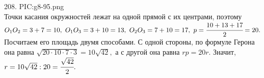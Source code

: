 208. {{PIC:g8-95.png}}\\
Точки касания окружностей лежат на одной прямой с их центрами, поэтому $O_1O_2=3+7=10,\ O_1O_3=3+10=13,\ O_2O_3=7+10=17,\ p=\cfrac{10+13+17}{2}=20.$ Посчитаем его площадь двумя способами. С одной стороны, по формуле Герона она равна $\sqrt{20\cdot10\cdot7\cdot3}=10\sqrt{42},$ а с другой она равна $rp=20r.$ Значит, $r=10\sqrt{42}:20=\cfrac{\sqrt{42}}{2}.$\\

